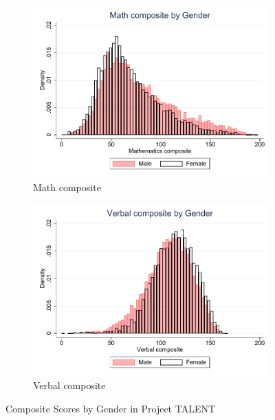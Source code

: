 \documentclass[onehalfspacing,11pt]{article}
\begin{document}
\begin{figure}
	\begin{subfigure}{0.49\textwidth}
		\includegraphics[width=\linewidth]{TALENT_math_by_gender.pdf}
		\caption{Math composite} \label{fig:nlsy79}
	\end{subfigure}
	\hspace*{\fill} %
	\begin{subfigure}{0.49\textwidth}
		\includegraphics[width=\linewidth]{TALENT_verb_by_gender.pdf}
		\caption{Verbal composite} \label{fig:nlsy97bygender}
	\end{subfigure}
	\caption{Composite Scores by Gender in Project TALENT} \label{fig:talent_gender}
\end{figure}
\end{document}
